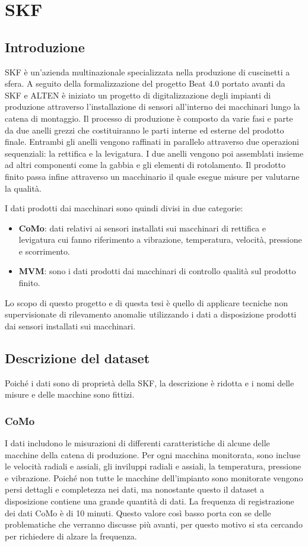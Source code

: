 \chapter{SKF}
\label{chap:skf}

\section{Introduzione}
SKF è un'azienda multinazionale specializzata nella produzione di cuscinetti a sfera. A seguito della formalizzazione del progetto Beat 4.0 portato avanti da SKF e ALTEN è iniziato un progetto di digitalizzazione degli impianti di produzione attraverso l'installazione di sensori all'interno dei macchinari lungo la catena di montaggio.
Il processo di produzione è composto da varie fasi e parte da due anelli grezzi che costituiranno le parti interne ed esterne del prodotto finale. Entrambi gli anelli vengono raffinati in parallelo attraverso due operazioni sequenziali: la rettifica e la levigatura. 
I due anelli vengono poi assemblati insieme ad altri componenti come la gabbia e gli elementi di rotolamento. Il prodotto finito passa infine attraverso un macchinario il quale esegue misure per valutarne la qualità. 

I dati prodotti dai macchinari sono quindi divisi in due categorie: 
\begin{itemize}
	\item \textbf{CoMo}: dati relativi ai sensori installati sui macchinari di rettifica e levigatura cui fanno riferimento a vibrazione, temperatura, velocità, pressione e scorrimento.
	\item \textbf{MVM}: sono i dati prodotti dai macchinari di controllo qualità sul prodotto finito.
\end{itemize}

Lo scopo di questo progetto e di questa tesi è quello di applicare tecniche non supervisionate di rilevamento anomalie utilizzando i dati a disposizione prodotti dai sensori installati sui macchinari.

\section{Descrizione del dataset}
Poiché i dati sono di proprietà della SKF, la descrizione è ridotta e i nomi delle misure e delle macchine sono fittizi.


\subsection{CoMo}
I dati includono le misurazioni di differenti caratteristiche di alcune delle macchine della catena di produzione. Per ogni macchina monitorata, sono incluse le velocità radiali e assiali, gli inviluppi radiali e assiali, la temperatura, pressione e vibrazione.
Poiché non tutte le macchine dell'impianto sono monitorate vengono persi dettagli e completezza nei dati, ma nonostante questo il dataset a disposizione contiene una grande quantità di dati.
La frequenza di registrazione dei dati CoMo è di 10 minuti. Questo valore così basso porta con se delle problematiche che verranno discusse più avanti, per questo motivo si sta cercando per richiedere di alzare la frequenza.

